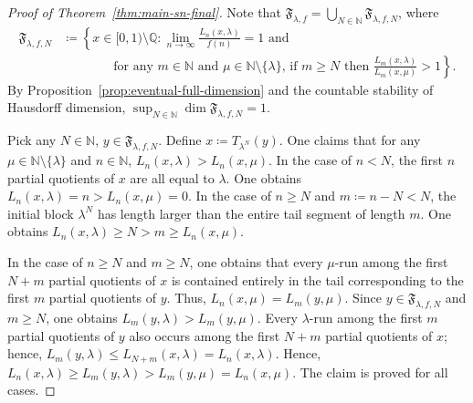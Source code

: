 \documentclass[10pt,a4paper]{amsart}
\begin{document}
\begin{proof}[Proof of Theorem~\ref{thm:main-sn-final}]
Note that $\mathfrak{F}_{\lambda,f}=\bigcup_{N\in\mathbb{N}}\mathfrak{F}_{\lambda,f,N}$, where
\begin{align*}
    \mathfrak{F}_{\lambda,f,N}
    &\coloneqq
    \left\{x\in[0,1)\setminus\mathbb{Q}:
    \lim_{n\to\infty}\frac{L_n(x,\lambda)}{f(n)}=1
    \text{ and }\right.\\
    &\qquad\qquad\left.\text{for any $m\in\mathbb{N}$ and $\mu\in\mathbb{N}\setminus\{\lambda\}$, if $m\geq N$ then }\frac{L_m(x,\lambda)}{L_m(x,\mu)}>1\right\}.
\end{align*}
By Proposition~\ref{prop:eventual-full-dimension} and the countable stability of Hausdorff dimension, $\sup_{N\in\mathbb{N}}{\dim{\mathfrak{F}_{\lambda,f,N}}}=1$.

Pick any $N\in\mathbb{N}$, $y\in\mathfrak{F}_{\lambda,f,N}$. Define $x\coloneqq T_{\lambda^N}(y)$. One claims that for any $\mu\in\mathbb{N}\setminus\{\lambda\}$ and $n\in\mathbb{N}$, $L_n(x,\lambda)>L_n(x,\mu)$. In the case of $n<N$, the first $n$ partial quotients of $x$ are all equal to $\lambda$. One obtains $L_n(x,\lambda)=n>L_n(x,\mu)=0$. In the case of $n\geq N$ and $m\coloneqq n-N<N$, the initial block $\lambda^N$ has length larger than the entire tail segment of length $m$. One obtains $L_n(x,\lambda)\geq N>m\geq L_n(x,\mu)$.

In the case of $n\geq N$ and $m\geq N$, one obtains that every $\mu$-run among the first $N+m$ partial quotients of $x$ is contained entirely in the tail corresponding to the first $m$ partial quotients of $y$. Thus, $L_n(x,\mu)=L_m(y,\mu)$. Since $y\in\mathfrak{F}_{\lambda,f,N}$ and $m\geq N$, one obtains $L_m(y,\lambda)>L_m(y,\mu)$. Every $\lambda$-run among the first $m$ partial quotients of $y$ also occurs among the first $N+m$ partial quotients of $x$; hence, $L_m(y,\lambda)\leq L_{N+m}(x,\lambda)=L_n(x,\lambda)$. Hence, $L_n(x,\lambda)\geq L_m(y,\lambda)>L_m(y,\mu)=L_n(x,\mu)$. The claim is proved for all cases.


\end{proof}
\end{document}
